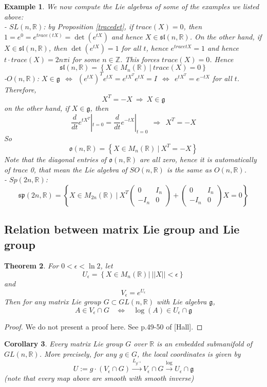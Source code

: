 \documentclass[11pt]{article}
\newtheorem{theorem}{Theorem}[section]
\newtheorem{corollary}[theorem]{Corollary}
\newtheorem{example}[theorem]{Example}
\newcommand{\bb}[1]{\mathbb{#1}}
\newcommand{\mf}[1]{\mathfrak{#1}}
\begin{document}
\begin{example}
We now compute the Lie algebras of some of the examples we listed above:\\
- $SL(n,\bb{R})$: by Proposition \ref{tracedet}, if $trace(X) = 0$, then $1 = e^0 = e^{trace(tX)} = \det(e^{tX})$ and hence $X \in \mf{sl}(n,\bb{R})$. On the other hand, if $X \in \mf{sl}(n,\bb{R})$, then $\det(e^{tX}) = 1$ for all $t$, hence $e^{trace{tX}} = 1$ and hence $t\cdot trace(X) = 2n\pi i$ for some $n \in \bb{Z}$. This forces $trace(X) = 0$. Hence
$$\mf{sl}(n,\bb{R}) = \left\{ X \in M_n(\bb{R})\ \Big|\ trace(X) = 0 \right\}$$
-$O(n,\bb{R})$: $X \in \mf{g}\ \ \Longleftrightarrow \ \ (e^{tX})^Te^{tX} = e^{tX^T}e^{tX} = I \ \ \Longleftrightarrow \ \ e^{tX^T} = e^{-tX}$ for all $t$. Therefore,
$$X^T = -X\  \Longrightarrow\ X \in \mf{g}$$
on the other hand, if $X \in \mf{g}$, then
$$\frac{d}{dt}e^{tX^T}|_{t = 0} = \frac{d}{dt}e^{-tX}|_{t=0}\ \ \Longrightarrow\ \ X^T = -X$$
So
$$\mf{o}(n,\bb{R}) = \left\{ X \in M_n(\bb{R})\ \Big|\ X^T = -X \right\}$$
Note that the diagonal entries of $\mf{o}(n,\bb{R})$ are all zero, hence it is automatically of trace 0, that mean the Lie algebra of $SO(n,\bb{R})$ is the same as $O(n,\bb{R})$.\\
- $Sp(2n,\bb{R})$:
$$\mf{sp}(2n,\bb{R}) = \left\{ X \in M_{2n}(\bb{R})\ \Big|\ X^T\left( \begin{array}{cc}
0 & I_n  \\
-I_n & 0 \end{array} \right) + \left( \begin{array}{cc}
0 & I_n  \\
-I_n & 0 \end{array} \right)X = 0 \right\}$$
\end{example}

\subsection{Relation between matrix Lie group and Lie group}
\begin{theorem} \label{explog}
For $0 < \epsilon < \ln 2$, let
$$U_{\epsilon} = \left\{X \in M_n(\bb{R})|\ ||X||<\epsilon \right\}$$ and
$$V_{\epsilon} = e^{U_{\epsilon}}$$
Then for any matrix Lie group $G \subset GL(n,\bb{R})$ with Lie algebra $\mf{g}$,
$$A \in V_{\epsilon} \cap G \ \ \ \  \Longleftrightarrow \ \ \ \ \log(A) \in U_{\epsilon} \cap \mf{g}$$
\end{theorem}
\begin{proof}
We do not present a proof here. See p.49-50 of [Hall].
\end{proof}
\begin{corollary} \label{embed}
Every matrix Lie group $G$ over $\bb{R}$ is an embedded submanifold of $GL(n,\bb{R})$. More precisely, for any $g \in G$, the local coordinates is given by
$$U := g\cdot (V_{\epsilon} \cap G) \stackrel{L_{g^{-1}}}{\longrightarrow} V_{\epsilon} \cap G \stackrel{\log}{\longrightarrow}  U_{\epsilon} \cap \mf{g}$$
(note that every map above are smooth with smooth inverse)
\end{corollary}
\end{document}
